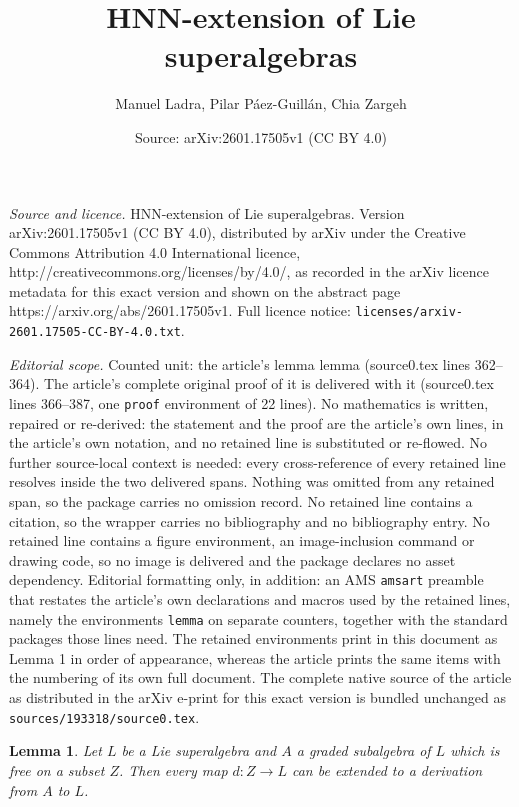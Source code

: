 \documentclass[10pt,a4paper]{amsart}
\title{HNN-extension of Lie superalgebras}
\author{Manuel Ladra, Pilar P\'aez-Guill\'an, Chia Zargeh}
\date{Source: arXiv:2601.17505v1 (CC BY 4.0)}
\newtheorem{lemma}{Lemma}
\begin{document}
\maketitle

\noindent\emph{Source and licence.} HNN-extension of Lie superalgebras. Version arXiv:2601.17505v1 (CC BY 4.0), distributed by arXiv under the Creative Commons Attribution 4.0 International licence, http://creativecommons.org/licenses/by/4.0/, as recorded in the arXiv licence metadata for this exact version and shown on the abstract page https://arxiv.org/abs/2601.17505v1. Full licence notice: \texttt{licenses/arxiv-2601.17505-CC-BY-4.0.txt}.\par\smallskip

\noindent\textit{Editorial scope.} Counted unit: the article's lemma lemma (source0.tex lines 362--364). The article's complete original proof of it is delivered with it (source0.tex lines 366--387, one \texttt{proof} environment of 22 lines). No mathematics is written, repaired or re-derived: the statement and the proof are the article's own lines, in the article's own notation, and no retained line is substituted or re-flowed.  No further source-local context is needed: every cross-reference of every retained line resolves inside the two delivered spans.  Nothing was omitted from any retained span, so the package carries no omission record.  No retained line contains a citation, so the wrapper carries no bibliography and no bibliography entry.  No retained line contains a figure environment, an image-inclusion command or drawing code, so no image is delivered and the package declares no asset dependency.  Editorial formatting only, in addition: an AMS \texttt{amsart} preamble that restates the article's own declarations and macros used by the retained lines, namely the environments \texttt{lemma} on separate counters, together with the standard packages those lines need.  The retained environments print in this document as Lemma 1 in order of appearance, whereas the article prints the same items with the numbering of its own full document.  The complete native source of the article as distributed in the arXiv e-print for this exact version is bundled unchanged as \texttt{sources/193318/source0.tex}.
\begin{lemma}
Let $L$ be a Lie superalgebra and $A$ a graded subalgebra of $L$ which is free on a subset $Z$. Then every map $d \colon Z \to L$ can be extended to a derivation from $A$ to $L$.
\end{lemma}
\end{document}
